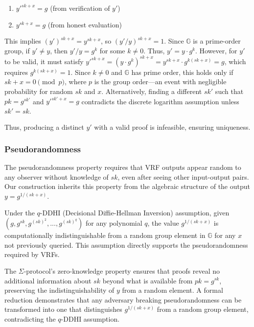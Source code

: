 \begin{enumerate}
    \item $y'^{sk+x} = g$ (from verification of $y'$)
    \item $y^{sk+x} = g$ (from honest evaluation)
\end{enumerate}

This implies $(y')^{sk+x} = y^{sk+x}$, so $(y'/y)^{sk+x} = 1$. Since $\mathbb{G}$ is a prime-order group, if $y' \neq y$, then $y'/y = g^k$ for some $k \neq 0$. Thus, $y' = y \cdot g^k$. However, for $y'$ to be valid, it must satisfy $y'^{sk+x} = (y \cdot g^k)^{sk+x} = y^{sk+x} \cdot g^{k(sk+x)} = g$, which requires $g^{k(sk+x)} = 1$. Since $k \neq 0$ and $\mathbb{G}$ has prime order, this holds only if $sk + x = 0 \pmod{p}$, where $p$ is the group order—an event with negligible probability for random $sk$ and $x$. Alternatively, finding a different $sk'$ such that $pk = g^{sk'}$ and $y'^{sk'+x} = g$ contradicts the discrete logarithm assumption unless $sk' = sk$.

Thus, producing a distinct $y'$ with a valid proof is infeasible, ensuring uniqueness.

\subsubsection{Pseudorandomness}
The pseudorandomness property requires that VRF outputs appear random to any observer without knowledge of $sk$, even after seeing other input-output pairs. Our construction inherits this property from the algebraic structure of the output $y = g^{1/(sk+x)}$.

Under the $q$-DDHI (Decisional Diffie-Hellman Inversion) assumption, given $(g, g^{sk}, g^{(sk)^2}, ..., g^{(sk)^q})$ for any polynomial $q$, the value $g^{1/(sk+x)}$ is computationally indistinguishable from a random group element in $\mathbb{G}$ for any $x$ not previously queried. This assumption directly supports the pseudorandomness required by VRFs.

The $\Sigma$-protocol's zero-knowledge property ensures that proofs reveal no additional information about $sk$ beyond what is available from $pk = g^{sk}$, preserving the indistinguishability of $y$ from a random element. A formal reduction demonstrates that any adversary breaking pseudorandomness can be transformed into one that distinguishes $g^{1/(sk+x)}$ from a random group element, contradicting the $q$-DDHI assumption.

